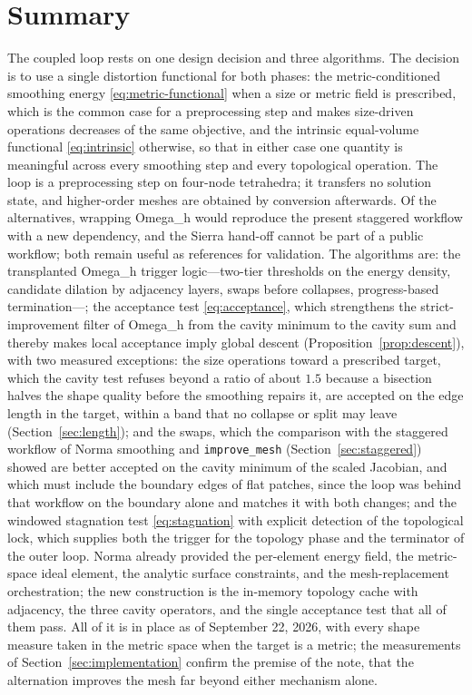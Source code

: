 \documentclass[11pt]{article}
\newcommand{\code}[1]{\texttt{#1}}
\newcommand{\omegah}{Omega\_h}
\begin{document}
\section{Summary}
\label{sec:summary}

The coupled loop rests on one design decision and three algorithms. The
decision is to use a single distortion functional for both phases: the
metric-conditioned smoothing energy \eqref{eq:metric-functional} when a
size or metric field is prescribed, which is the common case for a
preprocessing step and makes size-driven operations decreases of the
same objective, and the intrinsic equal-volume functional
\eqref{eq:intrinsic} otherwise, so that in either case one quantity is
meaningful across every smoothing step and every topological operation.
The loop is a preprocessing step on four-node tetrahedra; it transfers
no solution state, and higher-order meshes are obtained by conversion
afterwards. Of the alternatives, wrapping \omegah{} would reproduce the
present staggered workflow with a new dependency, and the Sierra
hand-off cannot be part of a public workflow; both remain useful as
references for validation. The algorithms are: the transplanted \omegah{} trigger
logic---two-tier thresholds on the energy density, candidate dilation by
adjacency layers, swaps before collapses, progress-based
termination---; the acceptance test \eqref{eq:acceptance}, which strengthens
the strict-improvement filter of \omegah{} from the cavity minimum to
the cavity sum and thereby makes local acceptance imply global descent
(Proposition~\ref{prop:descent}), with two measured exceptions: the
size operations toward a prescribed target, which the cavity test
refuses beyond a ratio of about $1.5$ because a bisection halves the
shape quality before the smoothing repairs it, are accepted on the edge
length in the target, within a band that no collapse or split may leave
(Section~\ref{sec:length}); and the swaps, which the comparison with the
staggered workflow of Norma smoothing and \code{improve\_mesh}
(Section~\ref{sec:staggered}) showed are better accepted on the cavity
minimum of the scaled Jacobian, and which must include the boundary edges
of flat patches, since the loop was behind that workflow on the boundary
alone and matches it with both changes; and the windowed stagnation test
\eqref{eq:stagnation} with explicit detection of the topological lock,
which supplies both the trigger for the topology phase and the
terminator of the outer loop. Norma already provided the per-element
energy field, the metric-space ideal element, the analytic surface
constraints, and the mesh-replacement orchestration; the new construction
is the in-memory topology cache with adjacency, the three cavity
operators, and the single acceptance test that all of them pass. All of
it is in place as of September 22, 2026, with every shape measure taken
in the metric space when the target is a metric; the measurements of
Section~\ref{sec:implementation} confirm the premise of the note, that
the alternation improves the mesh far beyond either mechanism alone.
\end{document}
